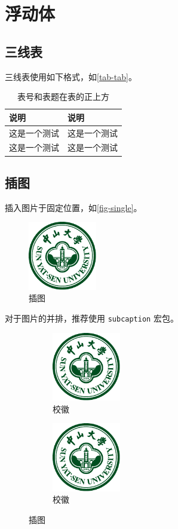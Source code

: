 \section{浮动体}

\subsection{三线表}

三线表使用如下格式，如\autoref{tab-tab}。

\begin{table}[H]
	\centering
	\caption{表号和表题在表的正上方}
	\label{tab-tab}
	\begin{tabular}{ll}
		\toprule
		说明     & 说明     \\
		\midrule
		这是一个测试 & 这是一个测试 \\
		这是一个测试 & 这是一个测试 \\
		\bottomrule
	\end{tabular}
\end{table}

\subsection{插图}

插入图片于固定位置，如\autoref{fig-single}。
\begin{figure}[H]
	\centering
	\includegraphics[width=3cm]{figures/sysu-badge.pdf}
	\caption{插图}
	\label{fig-single}
\end{figure}

对于图片的并排，推荐使用 \verb|subcaption| 宏包。

\begin{figure}[H]
	\centering
	\begin{subfigure}{3cm}
		\centering
		\includegraphics[width=3cm]{figures/sysu-badge.pdf}
		\caption{校徽}
	\end{subfigure}
	\hspace{3cm}
	\begin{subfigure}{3cm}
		\centering
		\includegraphics[width=3cm]{figures/sysu-badge.pdf}
		\caption{校徽}
	\end{subfigure}
	\caption{插图}
	\label{fig-example}
\end{figure}

